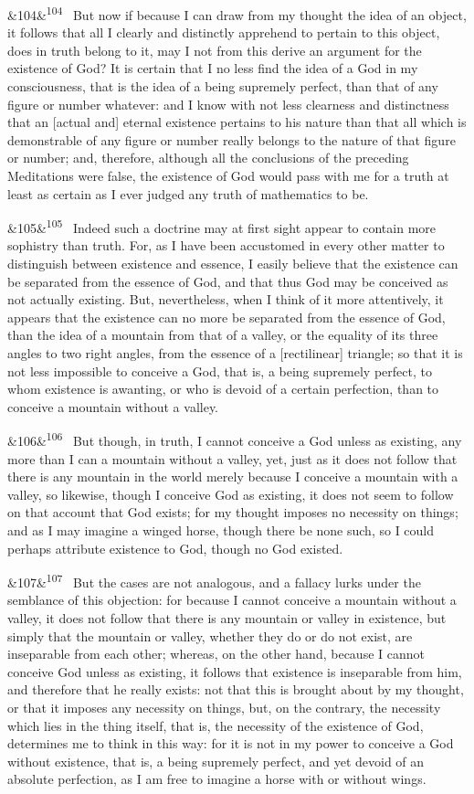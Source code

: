 \documentclass[12pt]{article}
\newcommand{\para}[1][]{\par\noindent\ifx&#1&\else\textsuperscript{\footnotesize #1}~\fi}
\begin{document}
\para[104] But now if because I can draw from my thought the idea of an object, it follows that all I clearly and distinctly apprehend to pertain to this object, does in truth belong to it, may I not from this derive an argument for the existence of God? It is certain that I no less find the idea of a God in my consciousness, that is the idea of a being supremely perfect, than that of any figure or number whatever: and I know with not less clearness and distinctness that an [actual and] eternal existence pertains to his nature than that all which is demonstrable of any figure or number really belongs to the nature of that figure or number; and, therefore, although all the conclusions of the preceding Meditations were false, the existence of God would pass with me for a truth at least as certain as I ever judged any truth of mathematics to be.

\para[105] Indeed such a doctrine may at first sight appear to contain more sophistry than truth. For, as I have been accustomed in every other matter to distinguish between existence and essence, I easily believe that the existence can be separated from the essence of God, and that thus God may be conceived as not actually existing. But, nevertheless, when I think of it more attentively, it appears that the existence can no more be separated from the essence of God, than the idea of a mountain from that of a valley, or the equality of its three angles to two right angles, from the essence of a [rectilinear] triangle; so that it is not less impossible to conceive a God, that is, a being supremely perfect, to whom existence is awanting, or who is devoid of a certain perfection, than to conceive a mountain without a valley.

\para[106] But though, in truth, I cannot conceive a God unless as existing, any more than I can a mountain without a valley, yet, just as it does not follow that there is any mountain in the world merely because I conceive a mountain with a valley, so likewise, though I conceive God as existing, it does not seem to follow on that account that God exists; for my thought imposes no necessity on things; and as I may imagine a winged horse, though there be none such, so I could perhaps attribute existence to God, though no God existed.

\para[107] But the cases are not analogous, and a fallacy lurks under the semblance of this objection: for because I cannot conceive a mountain without a valley, it does not follow that there is any mountain or valley in existence, but simply that the mountain or valley, whether they do or do not exist, are inseparable from each other; whereas, on the other hand, because I cannot conceive God unless as existing, it follows that existence is inseparable from him, and therefore that he really exists: not that this is brought about by my thought, or that it imposes any necessity on things, but, on the contrary, the necessity which lies in the thing itself, that is, the necessity of the existence of God, determines me to think in this way: for it is not in my power to conceive a God without existence, that is, a being supremely perfect, and yet devoid of an absolute perfection, as I am free to imagine a horse with or without wings.
\end{document}

